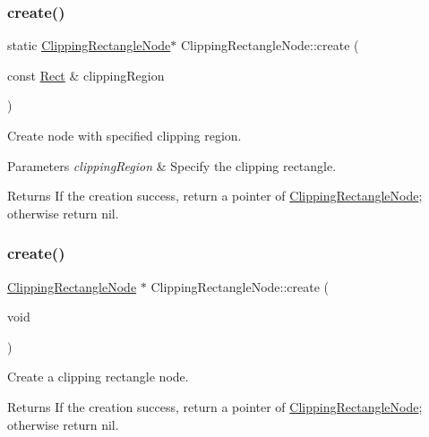 \subsubsection{\texorpdfstring{create()}{create()}\hspace{0.1cm}{\footnotesize\ttfamily [2/4]}}
{\footnotesize\ttfamily static \hyperlink{classClippingRectangleNode}{Clipping\+Rectangle\+Node}$\ast$ Clipping\+Rectangle\+Node\+::create (\begin{DoxyParamCaption}\item[{const \hyperlink{classRect}{Rect} \&}]{clipping\+Region }\end{DoxyParamCaption})\hspace{0.3cm}{\ttfamily [static]}}



Create node with specified clipping region. 


\begin{DoxyParams}{Parameters}
{\em clipping\+Region} & Specify the clipping rectangle. \\
\hline
\end{DoxyParams}
\begin{DoxyReturn}{Returns}
If the creation success, return a pointer of \hyperlink{classClippingRectangleNode}{Clipping\+Rectangle\+Node}; otherwise return nil. 
\end{DoxyReturn}
\mbox{\label{classClippingRectangleNode_a69d4c06c031688276ed42221800adef4}} 
\subsubsection{\texorpdfstring{create()}{create()}\hspace{0.1cm}{\footnotesize\ttfamily [3/4]}}
{\footnotesize\ttfamily \hyperlink{classClippingRectangleNode}{Clipping\+Rectangle\+Node} $\ast$ Clipping\+Rectangle\+Node\+::create (\begin{DoxyParamCaption}\item[{void}]{ }\end{DoxyParamCaption})\hspace{0.3cm}{\ttfamily [static]}}



Create a clipping rectangle node. 

\begin{DoxyReturn}{Returns}
If the creation success, return a pointer of \hyperlink{classClippingRectangleNode}{Clipping\+Rectangle\+Node}; otherwise return nil. 
\end{DoxyReturn}
\mbox{\label{classClippingRectangleNode_afc5eb0f59ea2d381e67875d7d1f7318d}} 
